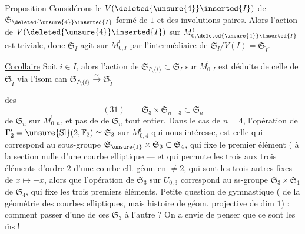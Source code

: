 \uline{Proposition} Considérons le 
$V(\deleted{\unsure{4}}\inserted{I})$ de $\mathfrak{S}_{\deleted{\unsure{4}}\inserted{I}}$ formé de $1$ et des involutions
paires. Alors l'action de $V(\deleted{\unsure{4}}\inserted{I})$ sur $M_{0,\deleted{\unsure{4}}\inserted{I}}^{!}$
est triviale,  donc  $\mathfrak{S}_I$ agit
sur $M_{0,I}^{!}$ par l'intermédiaire de
$\mathfrak{S}_I/V(I)=\mathfrak{S}_{\widetilde I}$.


\uline{Corollaire} Soit $i\in I$, alors l'action
de $\mathfrak{S}_{I\setminus\{i\}}\subset\mathfrak{S}_I$ sur $M_{0,I}^{!}$ est déduite
de celle de $\mathfrak{S}_{\widetilde I}$ via l'isom can $\mathfrak{S}_{I\setminus\{i\}}\xrightarrow{\sim}\mathfrak{S}_{\widetilde I}$

 des 
\[
 (31)\qquad \mathfrak{S}_3\times\mathfrak{S}_{n-3}\subset\mathfrak{S}_n
\]
de $\mathfrak{S}_n$ sur $M_{0,n}^{!}$, et pas de  de
$\mathfrak{S}_n$ tout entier. Dans le cas de $n=4$,
l'opération de $\Gamma'_2=\unsure{\mathrm{Sl}}(2,\mathbb{F}_2)\simeq\mathfrak{S}_3$ sur
$M_{0,4}^{!}$ qui nous intéresse, est celle qui
correspond au sous-groupe $\mathfrak{S}_{\unsure{1}}\times\mathfrak{S}_3\subset\mathfrak{S}_4$,
qui fixe le premier élément ( à
la section nulle d'une courbe elliptique
---  et qui permute les trois 
 aux trois éléments d'ordre $2$
d'une courbe ell. géom en  $\ne 2$, qui
sont les trois autres  fixes de
$x\mapsto -x$, alors que l'opération  de
$\mathfrak{S}_3$ sur $U_{0,3}$ correspond au ss-groupe
$\mathfrak{S}_3\times\mathfrak{S}_1$ de $\mathfrak{S}_4$, qui fixe les trois premiers
éléments. Petite question de gymnastique
 (  de la
géométrie des courbes elliptiques, mais
histoire de géom. projective de dim $1$) :
comment passer d'une de ces 
$\mathfrak{S}_3$ à l'autre ? On a envie de penser que
ce sont les $\overline{\mathrm m}$s !


